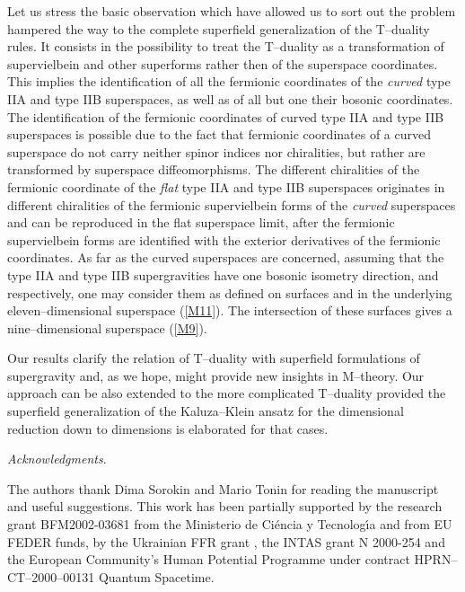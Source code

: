 \documentclass[a4paper,11pt]{article}
\begin{document}
Let us stress the  basic observation which have allowed us to 
sort out the problem hampered the way to the complete superfield   
generalization of the T--duality rules. 
It consists in the possibility to treat the T--duality as a transformation 
of supervielbein and other superforms rather then of the 
superspace coordinates.  
This implies the identification of all the fermionic coordinates of the 
{\sl curved} type IIA and type IIB superspaces, as well as of all but one 
their bosonic coordinates. 
The identification of the fermionic coordinates 
of curved type IIA and type IIB superspaces is possible due to the fact that 
 fermionic coordinates of a curved superspace do not carry neither spinor 
indices nor chiralities,  but rather are transformed by superspace 
diffeomorphisms. The different chiralities of the fermionic coordinate 
of the {\sl flat}   type IIA and type IIB superspaces originates 
in different chiralities of the fermionic supervielbein forms of 
the {\sl curved} superspaces and can be reproduced in the flat superspace 
limit, after the fermionic supervielbein forms are identified 
with the exterior derivatives of the fermionic coordinates.  
As far as the curved superspaces are concerned, 
assuming that the type IIA and 
type IIB supergravities have one bosonic isometry direction, \coordHE{} and \coordHE{} 
respectively, one may consider them as defined on surfaces \coordHE{} and 
\coordHE{} in the underlying eleven--dimensional 
superspace \coordHE{} (\ref{M11}). 
The intersection of these surfaces gives a nine--dimensional superspace  
\coordHE{} (\ref{M9}). 

Our results  clarify the relation of T--duality with superfield 
formulations of supergravity and, as  we hope, might provide new 
insights in M--theory. 
Our approach  can be also extended to 
the more complicated  \coordHE{} T--duality provided 
the superfield generalization 
of the Kaluza--Klein ansatz for the dimensional reduction 
down to \coordHE{} dimensions is elaborated for that cases. 
  




\bigskip 


{\it Acknowledgments}. 

The authors thank Dima Sorokin and Mario Tonin for reading the manuscript 
and useful suggestions. 
This work has been partially supported by the research grant BFM2002-03681 
from the Ministerio de Ci\'encia y Tecnolog\'{\i}a and
from EU FEDER funds, 
by the Ukrainian FFR grant 
\coordHE{},  the INTAS grant N 2000-254 and the European Community's 
Human Potential Programme under contract HPRN--CT--2000--00131 Quantum 
Spacetime.  
\end{document}
